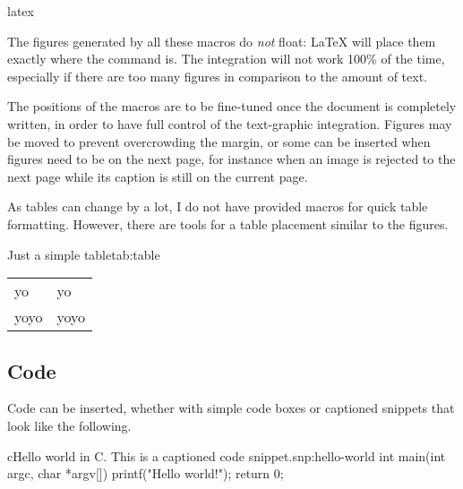 \documentclass[raggedright, twoside, 11pt]{tufte-style-article}
\begin{document}
\begin{codebox}{latex}
{}
\end{codebox}


The figures generated by all these macros do \textit{not} float: \LaTeX{} will place them exactly where the command is. The integration will not work 100\%{} of the time, especially if there are too many figures in comparison to the amount of text.

The positions of the macros are to be fine-tuned once the document is completely written, in order to have full control of the text-graphic integration. Figures may be moved to prevent overcrowding the margin, or some  can be inserted when figures need to be on the next page, for instance when an image is rejected to the next page while its caption is still on the current page.


As tables can change by a lot, I do not have provided macros for quick table formatting. However, there are tools for a table placement similar to the figures.

\begin{texttable}{Just a simple table}{tab:table}
\hfill
\begin{tabular}{ll}
yo & yo \\
yoyo & yoyo \\	
\end{tabular}	
\end{texttable}


\subsection{Code}
\label{sub:code}

Code can be inserted, whether with simple code boxes or captioned snippets that look like the following.
\begin{snippet}{c}{Hello world in C. This is a captioned code snippet.}{snp:hello-world}
int main(int argc, char *argv[]) {
	printf("Hello world!");
	return 0;
}
\end{snippet}
\end{document}
